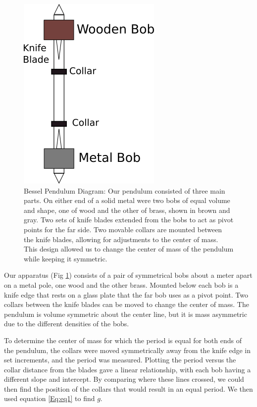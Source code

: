 \begin{figure}
\includegraphics[scale=0.5]{pendulumDiagram.png}
\caption{Bessel Pendulum Diagram: Our pendulum consisted of three main parts. On either end of a solid metal were two bobs of equal volume and shape, one of wood and the other of brass, shown in brown and gray. Two sets of knife blades extended from the bobs to act as pivot points for the far side. Two movable collars are mounted between the knife blades, allowing for adjustments to the center of mass. This design allowed us to change the center of mass of the pendulum while keeping it symmetric.}
\label{fig:Diagram}
\end{figure}

Our apparatus (Fig \ref{fig:Diagram}) consists of a pair of symmetrical bobs about a meter apart on a metal pole, one wood and the other brass. Mounted below each bob is a knife edge that rests on a glass plate that the far bob uses as a pivot point. Two collars between the knife blades can be moved to change the center of mass. The pendulum is volume symmetric about the center line, but it is mass asymmetric due to the different densities of the bobs. 

To determine the center of mass for which the period is equal for both ends of the pendulum, the collars were moved symmetrically away from the knife edge in set increments, and the period was measured. Plotting the period versus the collar distance from the blades gave a linear relationship, with each bob having a different slope and intercept. By comparing where these lines crossed, we could then find the position of the collars that would result in an equal period. We then used equation \ref{Eq:eq1} to find $g$.

